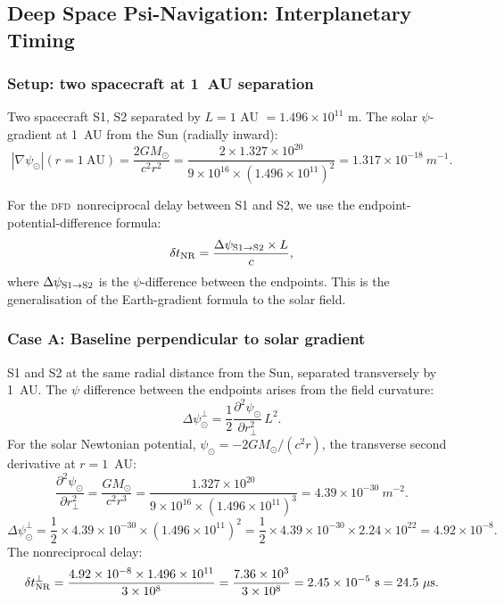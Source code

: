 \documentclass[aps,prd,twocolumn,superscriptaddress,nofootinbib,longbibliography]{revtex4-2}
\newcommand{\DFD}{\textsc{dfd}}
\begin{document}
\subsection{Deep Space Psi-Navigation: Interplanetary Timing}
\label{sec:deepspace}

\subsubsection{Setup: two spacecraft at 1~AU separation}

Two spacecraft S1, S2 separated by $L = 1$ AU $= 1.496\times10^{11}$ m.
The solar $\psi$-gradient at 1~AU from the Sun (radially inward):
\begin{equation}
|\nabla\psi_\odot|(r = 1\ \text{AU}) = \frac{2GM_\odot}{c^2 r^2}
= \frac{2\times1.327\times10^{20}}{9\times10^{16}\times(1.496\times10^{11})^2}
= 1.317\times10^{-18}\ \si{m^{-1}}.
\end{equation}

For the \DFD\ nonreciprocal delay between S1 and S2, we use the
endpoint-potential-difference formula:
\begin{equation}\label{eq:NR-deepspace}
\delta t_{\rm NR} = \frac{\Delta\psi_{\rm S1\to S2}\times L}{c},
\end{equation}
where $\Delta\psi_{\rm S1\to S2}$ is the $\psi$-difference between
the endpoints.  This is the generalisation of the Earth-gradient
formula to the solar field.

\subsubsection{Case A: Baseline perpendicular to solar gradient}

S1 and S2 at the same radial distance from the Sun, separated
transversely by 1~AU.  The $\psi$ difference between the endpoints
arises from the field curvature:
\begin{equation}
\Delta\psi_\odot^{\perp}
= \frac{1}{2}\frac{\partial^2\psi_\odot}{\partial r_\perp^2}\,L^2.
\end{equation}
For the solar Newtonian potential, $\psi_\odot = -2GM_\odot/(c^2 r)$,
the transverse second derivative at $r = 1$~AU:
\begin{equation}
\frac{\partial^2\psi_\odot}{\partial r_\perp^2}
= \frac{GM_\odot}{c^2 r^3}
= \frac{1.327\times10^{20}}{9\times10^{16}\times(1.496\times10^{11})^3}
= 4.39\times10^{-30}\ \si{m^{-2}}.
\end{equation}
\begin{equation}
\Delta\psi_\odot^{\perp}
= \frac{1}{2}\times4.39\times10^{-30}\times(1.496\times10^{11})^2
= \frac{1}{2}\times4.39\times10^{-30}\times2.24\times10^{22}
= 4.92\times10^{-8}.
\end{equation}
The nonreciprocal delay:
\begin{equation}
\delta t_{\rm NR}^{\perp}
= \frac{4.92\times10^{-8}\times1.496\times10^{11}}{3\times10^8}
= \frac{7.36\times10^{3}}{3\times10^8}
= 2.45\times10^{-5}\ \si{s} = 24.5\ \mu\si{s}.
\end{equation}
\end{document}
